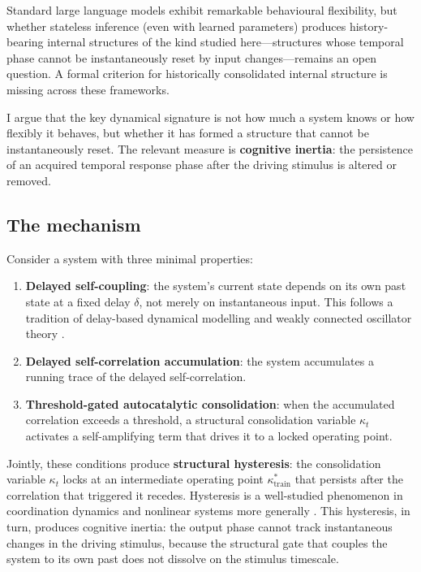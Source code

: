 Standard large language models \cite{brown2020language, openai2023gpt4} exhibit remarkable behavioural flexibility, but whether stateless inference (even with learned parameters) produces history-bearing internal structures of the kind studied here---structures whose temporal phase cannot be instantaneously reset by input changes---remains an open question. A formal criterion for historically consolidated internal structure is missing across these frameworks.

I argue that the key dynamical signature is not how much a system knows or how flexibly it behaves, but whether it has formed a structure that cannot be instantaneously reset. The relevant measure is \textbf{cognitive inertia}: the persistence of an acquired temporal response phase after the driving stimulus is altered or removed.

\subsection{The mechanism}

Consider a system with three minimal properties:
\begin{enumerate}[itemsep=0pt]
    \item \textbf{Delayed self-coupling}: the system's current state depends on its own past state at a fixed delay $\delta$, not merely on instantaneous input. This follows a tradition of delay-based dynamical modelling \cite{mackey1977oscillation, yanchuk2014multistability, hale1993introduction} and weakly connected oscillator theory \cite{hoppensteadt1997synaptic}.
    \item \textbf{Delayed self-correlation accumulation}: the system accumulates a running trace of the delayed self-correlation.
    \item \textbf{Threshold-gated autocatalytic consolidation}: when the accumulated correlation exceeds a threshold, a structural consolidation variable $\kappa_t$ activates a self-amplifying term that drives it to a locked operating point.
\end{enumerate}

Jointly, these conditions produce \textbf{structural hysteresis}: the consolidation variable $\kappa_t$ locks at an intermediate operating point $\kappa^*_{\mathrm{train}}$ that persists after the correlation that triggered it recedes. Hysteresis is a well-studied phenomenon in coordination dynamics \cite{haken1985theoretical, kelso1995dynamic} and nonlinear systems more generally \cite{pikovsky2001synchronization}. This hysteresis, in turn, produces cognitive inertia: the output phase cannot track instantaneous changes in the driving stimulus, because the structural gate that couples the system to its own past does not dissolve on the stimulus timescale.

